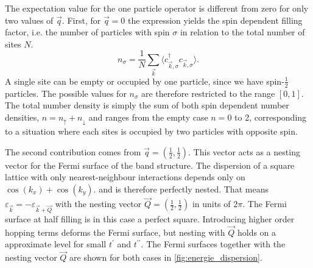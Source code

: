 The expectation value for the one particle operator is different from zero for only two values of $\vec q$.
First, for $\vec q = 0$ the expression yields the spin dependent filling factor, i.e. the number of particles with spin $\sigma$ in relation to the total number of sites $N$.
\begin{equation}
 n_{\sigma} = \frac1N \sum_{\vec k} \langle c^{\dagger}_{\vec k, \sigma} c_{\vec k, \sigma} \rangle.
\end{equation}
A single  site can be empty or occupied by one particle, since we have spin-$\frac12$ particles. The possible values for $n_{\sigma}$ are therefore restricted to the range $[0,1]$.
The total number density is simply the sum of both spin dependent number densities, $n=n_{\uparrow}+n_{\downarrow}$ 
and ranges from the empty case $n=0$ to 2, corresponding to a situation where each sites is occupied by two particles with opposite spin.

%
%
%
%
%
%
%
%
The second contribution comes from $\vec q = (\frac12, \frac12)$.
This vector acts as a nesting vector for the Fermi surface of the band structure. 
The dispersion of a square lattice with only nearest-neighbour interactions 
%
depends only on $\cos(k_x) + \cos(k_y)$.
and is therefore perfectly nested.
That means
$\varepsilon_{\vec k} = -\varepsilon_{\vec k + \vec Q}$ with the nesting vector $\vec Q = (\frac12,\frac12)$ in units of $2\pi$.
The Fermi surface at half filling is in this case a perfect square.
Introducing higher order hopping terms deforms the Fermi surface, but nesting with $\vec Q$ holds on a approximate level for small $t^{\prime}$ and $t^{\prime \prime}$.
The Fermi surfaces together with the nesting vector $\vec Q$ are shown for both cases in \ref{fig:energie_dispersion}.
%
%
%


